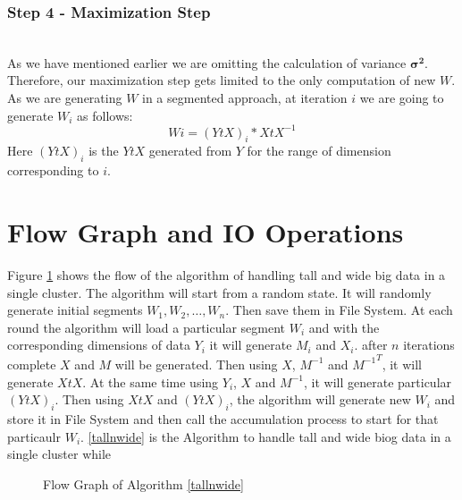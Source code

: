 \documentclass[12pt,notitlepage,oneside]{report}
\begin{document}
\subsubsection{\textbf{Step 4 - Maximization Step}}\hspace*{\fill} \\
As we have mentioned earlier we are omitting the calculation of variance $\pmb{\sigma ^2}$. Therefore, our maximization step gets limited to the only computation of new $W$. As we are generating $W$ in a segmented approach, at iteration $i$ we are going to generate $W_i$ as follows:
\begin{equation*}
    Wi = (YtX)_i * XtX^{-1}
\end{equation*}
Here $(YtX)_i$ is the $YtX$ generated from $Y$ for the range of dimension corresponding to $i$.


\section{Flow Graph and IO Operations}
Figure \ref{flow_graph} shows the flow of the algorithm of handling tall and wide big data in a single cluster. The algorithm will start from a random state. It will randomly generate initial segments $W_1, W_2, \dots , W_n$. Then save them in  File System. At each round the algorithm will load a particular segment $W_i$ and with the corresponding dimensions of data $Y_i$ it will generate $M_i$ and $X_i$. after $n$ iterations complete $X$ and $M$ will be generated. Then using $X$, $M^{-1}$ and ${M^{-1}}^T$, it will generate $XtX$. At the same time using $Y_i$, $X$ and $M^{-1}$, it will generate particular $(YtX)_i$. Then using $XtX$ and $(YtX)_i$, the algorithm will generate new $W_i$ and store it in File System and then call the accumulation process to start for that particaulr $W_i$. \ref{tallnwide} is the Algorithm to handle tall and wide biog data in a single cluster while 

\begin{figure}[!htbp]
\centering
{}
\caption{Flow Graph of Algorithm \ref{tallnwide}}
\label{flow_graph}
\end{figure}
\end{document}
